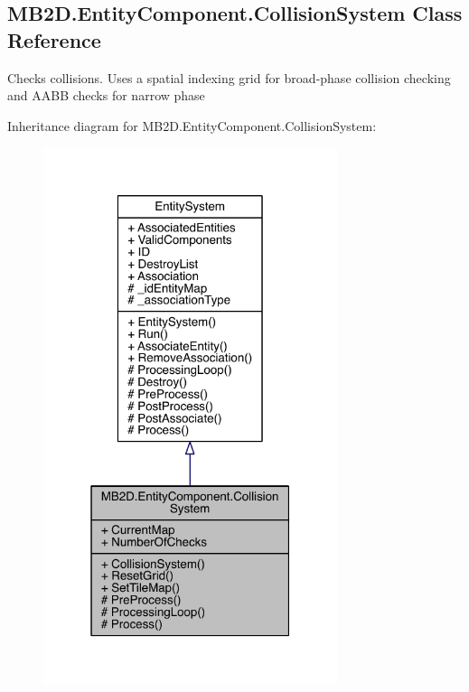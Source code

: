 \hypertarget{class_m_b2_d_1_1_entity_component_1_1_collision_system}{}\subsection{M\+B2\+D.\+Entity\+Component.\+Collision\+System Class Reference}
\label{class_m_b2_d_1_1_entity_component_1_1_collision_system}


Checks collisions. Uses a spatial indexing grid for broad-\/phase collision checking and A\+A\+BB checks for narrow phase  




Inheritance diagram for M\+B2\+D.\+Entity\+Component.\+Collision\+System\+:
\nopagebreak
\begin{figure}[H]
\begin{center}
\leavevmode
\includegraphics[width=244pt]{class_m_b2_d_1_1_entity_component_1_1_collision_system__inherit__graph}
\end{center}
\end{figure}


